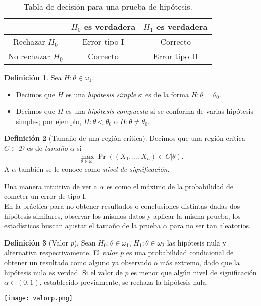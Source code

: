\documentclass[11pt,letterpaper]{article}
\theoremstyle{definition}
\newtheorem{definition}{Definición}[section]
\theoremstyle{theorem}
\theoremstyle{remark}
\begin{document}
	\begin{table}[h!]
		\centering
		\begin{tabular}{|c|c|c|} 
			\hline
			& \(H_0\) es verdadera & \(H_1\) es verdadera \\
			\hline
			Rechazar \(H_0\) & Error tipo I & Correcto \\ 
			\hline
			No rechazar \(H_0\) & Correcto & Error tipo II\\
			\hline
		\end{tabular}
		\caption{Tabla de decisión para una prueba de hipótesis.}
		\label{table:1}
	\end{table}
	\begin{definition}
		Sea \(H:\theta\in\omega_1\).
		\begin{itemize}
			\item Decimos que \(H\) es una \textit{hipótesis simple} si es de la forma \(H:\theta=\theta_0\).
			\item Decimos que \(H\) es una \textit{hipótesis compuesta} si se conforma de varias hipótesis simples; por ejemplo, \(H:\theta<\theta_0\) o \(H:\theta\neq\theta_0\).
		\end{itemize}
	\end{definition}
	\begin{definition}[Tamaño de una región crítica]
		Decimos que una región crítica \(C\subset\mathcal{D}\) es de \textit{tamaño} \(\alpha\) si \[\underset{\theta\in\omega_1}{\max}\Pr((X_1,\dots,X_n)\in C|\theta).\] A \(\alpha\) también se le conoce como \textit{nivel de significación}.
	\end{definition}
	Una manera intuitiva de ver a \(\alpha\) es como el máximo de la probabilidad de cometer un error de tipo I. \\
	En la práctica para no obtener resultados o conclusiones distintas dadas dos hipótesis similares, observar los mismos datos y aplicar la misma prueba, los estadísticos buscan ajustar el tamaño de la prueba \(\alpha\) para no ser tan aleatorios.
	\begin{definition}[Valor \(p\)]
		Sean \(H_0:\theta\in\omega_1\), \(H_1:\theta\in\omega_2\) las hipótesis nula y alternativa respectivamente. El \textit{valor \(p\)} es una probabilidad condicional de obtener un resultado como alguno ya observado o más extremo, dado que la hipótesis nula es verdad. Si el valor de \(p\) es menor que algún nivel de significación \(\alpha\in(0,1)\), establecido previamente, se rechaza la hipótesis nula.
	\end{definition}
	\begin{center}
		\texttt{[image: valorp.png]}
	\end{center}
\end{document}
